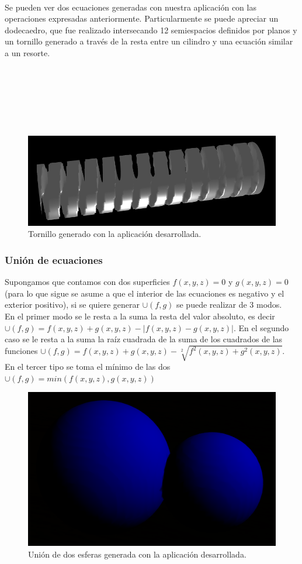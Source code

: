 \documentclass[12pt]{article}
\begin{document}
\\Se pueden ver dos ecuaciones generadas con nuestra aplicación con las operaciones expresadas anteriormente. Particularmente se puede apreciar un dodecaedro, que fue realizado intersecando 12 semiespacios definidos por planos y un tornillo generado a través de la resta entre un cilindro  y una ecuación similar a un resorte.
\\
\\
\\
\\
\\
\\
\\

\begin{figure}[h]
\includegraphics[width=0.7\linewidth,center]{tornillo.png}
\caption{Tornillo generado con la aplicación desarrollada.}
\end{figure}
\subsubsection{Unión de ecuaciones}
Supongamos que contamos con dos superficies $f(x,y,z)=0$ y $g(x,y,z)=0$ (para lo que sigue se asume a que el interior de las ecuaciones es negativo y el exterior positivo), si se quiere generar  $\cup(f,g)$ se puede realizar de 3 modos. 
\\En el primer modo se le resta a la suma la resta del valor absoluto, es decir $\cup(f,g) =  f(x,y,z) + g(x,y,z) - |f(x,y,z) - g(x,y,z)|$. 
 En el segundo caso se le resta a la suma la raíz cuadrada de la suma de los cuadrados de las funciones  $\cup(f,g) = f(x,y,z) + g(x,y,z) -\sqrt[2]{f^2(x,y,z) + g^2(x,y,z)}$.
\\En el tercer tipo se toma el mínimo de las dos  $\cup(f,g)=min(f(x,y,z),g(x,y,z))$
\clearpage
\begin{figure}[h]
\includegraphics[width=\linewidth,center]{oi1.png}
\caption{Unión de dos esferas generada con la aplicación desarrollada.}
\end{figure}
\end{document}
